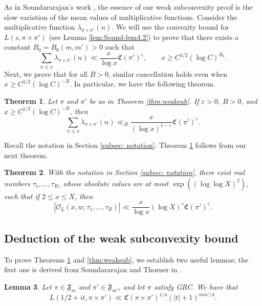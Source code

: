 \documentclass[12pt,reqno]{amsart}
\newtheorem{thm}{Theorem}[section]
\newtheorem{lem}[thm]{Lemma}
\theoremstyle{remark}
\numberwithin{equation}{section}
\begin{document}
    As in Soundararajan's work \cite{S}, the essence of our weak subconvexity proof is the slow variation of the mean values of multiplicative functions. Consider the multiplicative function $\lambda_{\pi \times \pi'}(n)$. We will use the convexity bound for $L(s, \pi \times \pi')$ (see Lemma \ref{lem:Sound-lem4.2}) to prove that there exists a constant $B_{0}=B_0(m,m') >0$ such that
	\[
            \sum_{n\le x} \lambda_{\pi \times \pi'}(n) \ll \frac{x}{\log x} \mathfrak{C}(\pi')^\varepsilon, \qquad x \ge C^{1/2}(\log C)^{B_{0}}. 
	\]
	Next, we prove that for all $B>0$, similar cancellation holds even when $x \ge C^{1/2}(\log C)^{-B}$. In particular, we have the following theorem. 
	
	
	\begin{thm}\label{thm:partial-sum-thm2-Sound}
		Let $\pi$ and $\pi'$ be as in Theorem \ref{thm:weaksub}. If $\varepsilon>0$, $B>0$, and $x\ge C^{1/2}(\log C)^{-B}$, then
		\begin{equation*}
			\sum_{n\le x} \lambda_{\pi \times \pi'}(n) \ll_{B} \frac{x}{(\log x)^{1-\varepsilon}}\mathfrak{C}(\pi')^\varepsilon.
		\end{equation*}
	\end{thm}

 
    Recall the notation in Section \ref{subsec: notation}. Theorem \ref{thm:partial-sum-thm2-Sound} follows from our next theorem.
	
	\begin{thm}
        \label{thm:2.1-Sound} With the notation in Section \ref{subsec: notation}, there exist real numbers $\tau_1, \ldots, \tau_R$, whose absolute values are at most $\exp((\log\log X)^2)$, such that if $2 \le x \le X$, then
	\begin{equation*}
            |\mathcal{O}_{\underline{L}}(x,w;\tau_1, \ldots, \tau_R)| \ll \frac{x}{\log x}(\log X)^{\varepsilon} \mathfrak{C}(\pi')^\varepsilon.
	\end{equation*} 
	\end{thm}
	
	
    
    \subsection{Deduction of the weak subconvexity bound}
    
    To prove Theorems \ref{thm:partial-sum-thm2-Sound} and \ref{thm:weaksub}, we establish two useful lemmas; the first one is derived from Soundararajan and Thorner in \cite{ST}.
	\begin{lem}\label{lem:Sound-Thorner-lem4.1} Let $\pi \in \mathfrak{F}_m$ and $ \pi' \in \mathfrak{F}_{m'}$, and let $\pi$ satisfy GRC. We have that
		\begin{equation*}
			L(1/2+it, \pi \times \pi') \ll \mathfrak{C}(\pi \times \pi')^{1/4}(|t|+1)^{{mm'}/{4}}.
		\end{equation*}
	\end{lem}
	
\end{document}
